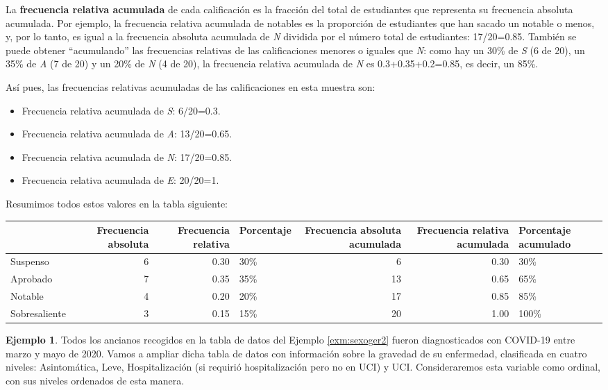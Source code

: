 \documentclass[
]{book}
\providecommand{\tightlist}{%
  \setlength{\itemsep}{0pt}\setlength{\parskip}{0pt}}
\theoremstyle{definition}
\theoremstyle{definition}
\newtheorem{example}{Ejemplo}[chapter]
\theoremstyle{definition}
\theoremstyle{definition}
\theoremstyle{remark}
\begin{document}
La \textbf{frecuencia relativa acumulada} de cada calificación es la fracción del total de estudiantes que representa su frecuencia absoluta acumulada. Por ejemplo, la frecuencia relativa acumulada de notables es la proporción de estudiantes que han sacado un notable o menos, y, por lo tanto, es igual a la frecuencia absoluta acumulada de \emph{N} dividida por el número total de estudiantes: 17/20=0.85. También se puede obtener ``acumulando'' las frecuencias relativas de las calificaciones menores o iguales que \emph{N}: como hay un 30\% de \emph{S} (6 de 20), un 35\% de \emph{A} (7 de 20) y un 20\% de \emph{N} (4 de 20), la frecuencia relativa acumulada de \emph{N} es 0.3+0.35+0.2=0.85, es decir, un 85\%.

Así pues, las frecuencias relativas acumuladas de las calificaciones en esta muestra son:

\begin{itemize}
\tightlist
\item
  Frecuencia relativa acumulada de \emph{S}: 6/20=0.3.
\item
  Frecuencia relativa acumulada de \emph{A}: 13/20=0.65.
\item
  Frecuencia relativa acumulada de \emph{N}: 17/20=0.85.
\item
  Frecuencia relativa acumulada de \emph{E}: 20/20=1.
\end{itemize}

Resumimos todos estos valores en la tabla siguiente:

\begin{tabular}{l|r|r|l|r|r|l}
\hline
  & Frecuencia absoluta & Frecuencia relativa & Porcentaje & Frecuencia absoluta acumulada & Frecuencia relativa acumulada & Porcentaje acumulado\\
\hline
Suspenso & 6 & 0.30 & 30\% & 6 & 0.30 & 30\%\\
\hline
Aprobado & 7 & 0.35 & 35\% & 13 & 0.65 & 65\%\\
\hline
Notable & 4 & 0.20 & 20\% & 17 & 0.85 & 85\%\\
\hline
Sobresaliente & 3 & 0.15 & 15\% & 20 & 1.00 & 100\%\\
\hline
\end{tabular}

\begin{example}
\protect\hypertarget{exm:sexoger3}{}\label{exm:sexoger3}Todos los ancianos recogidos en la tabla de datos del Ejemplo \ref{exm:sexoger2} fueron diagnosticados con COVID-19 entre marzo y mayo de 2020. Vamos a ampliar dicha tabla de datos con información sobre la gravedad de su enfermedad, clasificada en cuatro niveles: Asintomática, Leve, Hospitalización (si requirió hospitalización pero no en UCI) y UCI. Consideraremos esta variable como ordinal, con sus niveles ordenados de esta manera.
\end{example}
\end{document}
